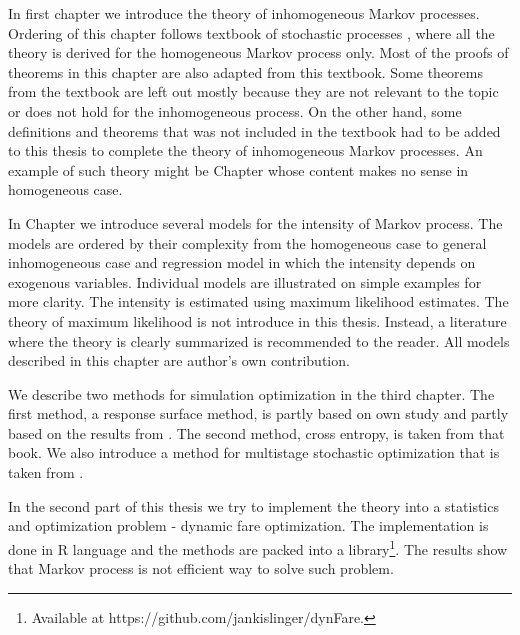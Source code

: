 In first chapter we introduce the theory of inhomogeneous Markov processes. Ordering of this chapter follows textbook of stochastic processes \cite{PraskovaLachout12}, where all the theory is derived for the homogeneous Markov process only. Most of the proofs of theorems in this chapter are also adapted from this textbook. Some theorems from the textbook are left out mostly because they are not relevant to the topic or does not hold for the inhomogeneous process. On the other hand, some definitions and theorems that was not included in the textbook had to be added to this thesis to complete the theory of inhomogeneous Markov processes. An example of such theory might be Chapter  whose content makes no sense in homogeneous case.

In Chapter  we introduce several models for the intensity of Markov process. The models are ordered by their complexity from the homogeneous case to general inhomogeneous case and regression model in which the intensity depends on exogenous variables. Individual models are illustrated on simple examples for more clarity. The intensity is estimated using maximum likelihood estimates. The theory of maximum likelihood is not introduce in this thesis. Instead, a literature where the theory is clearly summarized is recommended to the reader. All models described in this chapter are author's own contribution.

We describe two methods for simulation optimization in the third chapter. The first method, a response surface method, is partly based on own study and partly based on the results from \cite{Kroese11}. The second method, cross entropy, is taken from that book. We also introduce a method for multistage stochastic optimization that is taken from \cite{Pflug14}.

In the second part of this thesis we try to implement the theory into a statistics and optimization problem - dynamic fare optimization.
The implementation is done in R language and the methods are packed into a library\footnote{Available at https://github.com/jankislinger/dynFare.}.
The results show that Markov process is not efficient way to solve such problem.
